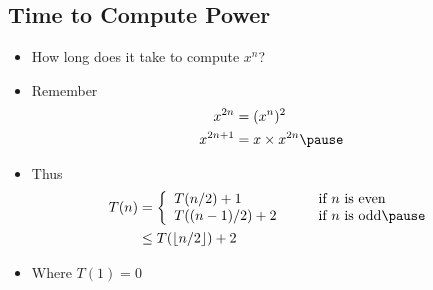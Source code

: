 
\begin{slide}
\section[-1]{Time to Compute Power}

\begin{PauseHighLight}
  \begin{itemize}\squeeze
  \item How long does it take to compute $x^n$?\pause
  \item Remember
  \begin{align*}
    x^{2n} &= (x^n)^2 \\
    x^{2n+1} &= x\times x^{2n}\pause
  \end{align*}\vspace{-1cm}
  \item Thus
    \begin{align*}
      T(n) &= \left\{
      \begin{array}{lll}
        T(n/2) + 1 & \quad & \mbox{if $n$ is even}\\
        T((n-1)/2) + 2 & \quad & \mbox{if $n$ is odd}\pause
      \end{array}\right. \\
    &\leq T(\lfloor n/2 \rfloor) + 2
    \end{align*}
  \item Where $T(1) = 0$\pause
  \end{itemize}
\end{PauseHighLight}
\end{slide}


